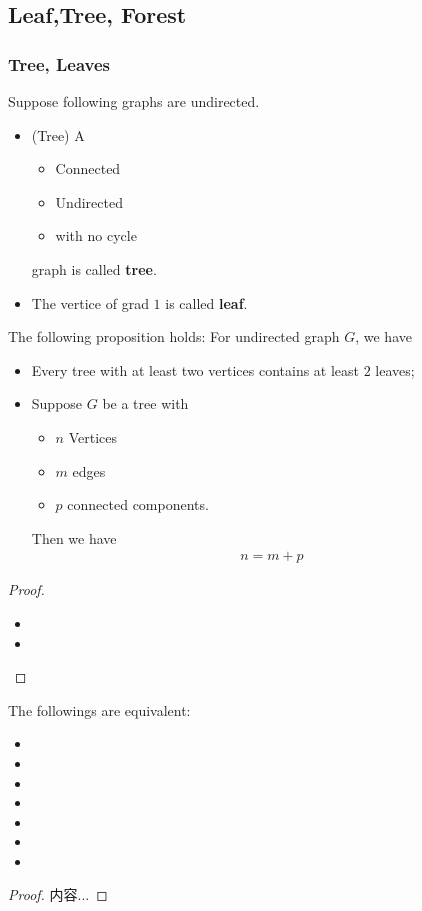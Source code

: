 \documentclass[Total.tex]{subfiles}
\begin{document}
			\subsection{Leaf,Tree, Forest}
				\subsubsection{Tree, Leaves}
					\begin{Def} Suppose following graphs are undirected.
						\begin{itemize}
							\item (Tree) A
							\begin{itemize}
								\item Connected
								\item Undirected
								\item with no cycle
							\end{itemize}
							graph is called \textbf{tree}.
							\item The vertice of grad $1$ is called \textbf{leaf}.
						\end{itemize}
					\end{Def}
					\begin{lemma}
						The following proposition holds: For undirected graph $G$, we have
						\begin{itemize}
							\item Every tree with at least two vertices contains at least $2$ leaves;
							\item Suppose $G$ be a tree with 
							\begin{itemize}
								\item $n$ Vertices
								\item $m$ edges
								\item $p$ connected components.
							\end{itemize}
							Then we have
							\begin{gather*}
								n=m+p
							\end{gather*}
						\end{itemize}
					\end{lemma}
					\begin{proof}
						\begin{itemize}
							\item 
							\item 
						\end{itemize}
					\end{proof}
					
					\begin{proposition}
						The followings are equivalent:
						\begin{itemize}
							\item 
							\item 
							\item 
							\item 
							\item 
							\item 
							\item 
						\end{itemize}
					\end{proposition}
					\begin{proof}
						内容...
					\end{proof}
\end{document}

